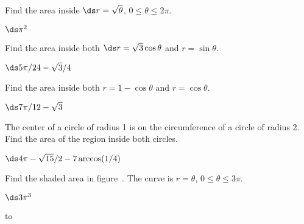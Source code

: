 \begin{exercises}
\begin{exercise} Find the area inside $\ds r=\sqrt{\theta}$, $0\le\theta\le2\pi$.
\begin{answer} $\ds \pi^2$
\end{answer}\end{exercise}

\begin{exercise} Find the area inside both $\ds r=\sqrt3\cos\theta$ and
$r=\sin\theta$.
\begin{answer} $\ds 5\pi/24-\sqrt3/4$
\end{answer}\end{exercise}

\begin{exercise} Find the area inside both $r=1-\cos\theta$
and $r=\cos\theta$.
\begin{answer} $\ds 7\pi/12-\sqrt3$
\end{answer}\end{exercise}

\begin{exercise} The center of a circle of radius 1 is on the 
circumference of a circle of radius 2. Find the area 
of the region inside both circles.
\begin{answer} $\ds 4\pi-\sqrt{15}/2-7\arccos(1/4)$
\end{answer}\end{exercise}

\begin{exercise} Find the shaded area in figure~. 
The curve is $r=\theta$, $0\le\theta\le3\pi$.
\begin{answer} $\ds 3\pi^3$
\end{answer}\end{exercise}

\figure
\hbox to 


\end{exercises}
